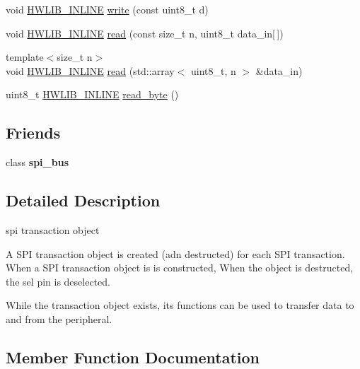 \begin{DoxyCompactItemize}
\item 
void \hyperlink{hwlib-defines_8hpp_a520a8905adc71f1757aea4ce05183585}{H\+W\+L\+I\+B\+\_\+\+I\+N\+L\+I\+NE} \hyperlink{classhwlib_1_1spi__bus_1_1spi__transaction_a5a9e7385743ee94b8316f602c7050044}{write} (const uint8\+\_\+t d)
\item 
void \hyperlink{hwlib-defines_8hpp_a520a8905adc71f1757aea4ce05183585}{H\+W\+L\+I\+B\+\_\+\+I\+N\+L\+I\+NE} \hyperlink{classhwlib_1_1spi__bus_1_1spi__transaction_a917b24c83ca922c30d31c1d1f8baf773}{read} (const size\+\_\+t n, uint8\+\_\+t data\+\_\+in\mbox{[}$\,$\mbox{]})
\item 
{\footnotesize template$<$size\+\_\+t n$>$ }\\void \hyperlink{hwlib-defines_8hpp_a520a8905adc71f1757aea4ce05183585}{H\+W\+L\+I\+B\+\_\+\+I\+N\+L\+I\+NE} \hyperlink{classhwlib_1_1spi__bus_1_1spi__transaction_a4c1968dd719d580abbd8752262c5b8c3}{read} (std\+::array$<$ uint8\+\_\+t, n $>$ \&data\+\_\+in)
\item 
uint8\+\_\+t \hyperlink{hwlib-defines_8hpp_a520a8905adc71f1757aea4ce05183585}{H\+W\+L\+I\+B\+\_\+\+I\+N\+L\+I\+NE} \hyperlink{classhwlib_1_1spi__bus_1_1spi__transaction_add2f3681b4455fe22109192d5fe3d9d5}{read\+\_\+byte} ()
\end{DoxyCompactItemize}
\subsection*{Friends}
\begin{DoxyCompactItemize}
\item 
\mbox{\label{classhwlib_1_1spi__bus_1_1spi__transaction_ad37893f774497c4f6cdbacbefd620532}} 
class {\bfseries spi\+\_\+bus}
\end{DoxyCompactItemize}


\subsection{Detailed Description}
spi transaction object

A S\+PI transaction object is created (adn destructed) for each S\+PI transaction. When a S\+PI transaction object is is constructed, When the object is destructed, the sel pin is deselected.

While the transaction object exists, its functions can be used to transfer data to and from the peripheral. 

\subsection{Member Function Documentation}
\mbox{\label{classhwlib_1_1spi__bus_1_1spi__transaction_a917b24c83ca922c30d31c1d1f8baf773}} 
